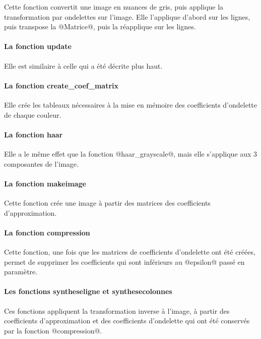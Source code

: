 \documentclass{article}
\begin{document}
Cette fonction convertit une image en nuances de gris, puis applique la transformation par ondelettes sur l'image. Elle l'applique d'abord sur les lignes, puis transpose la @Matrice@, puis la réapplique sur les lignes.

\paragraph{La fonction update}

Elle est similaire à celle qui a été décrite plus haut.

\paragraph{La fonction create\_{}coef\_{}matrix}

Elle crée les tableaux nécessaires à la mise en mémoire des coefficients d'ondelette de chaque couleur.

\paragraph{La fonction haar}

Elle a le même effet que la fonction @haar\_{}grayscale@, mais elle s'applique aux 3 composantes de l'image.

\paragraph{La fonction makeimage}

Cette fonction crée une image à partir des matrices des coefficients d'approximation.

\paragraph{La fonction compression}

Cette fonction, une fois que les matrices de coefficients d'ondelette ont été créées, permet de supprimer les coefficients qui sont inférieurs au @epsilon@ passé en paramètre.

\paragraph{Les fonctions syntheseligne et synthesecolonnes}

Ces fonctions appliquent la transformation inverse à l'image, à partir des coefficients d'approximation et des coefficients d'ondelette qui ont été conservés par la fonction @compression@.
\end{document}
